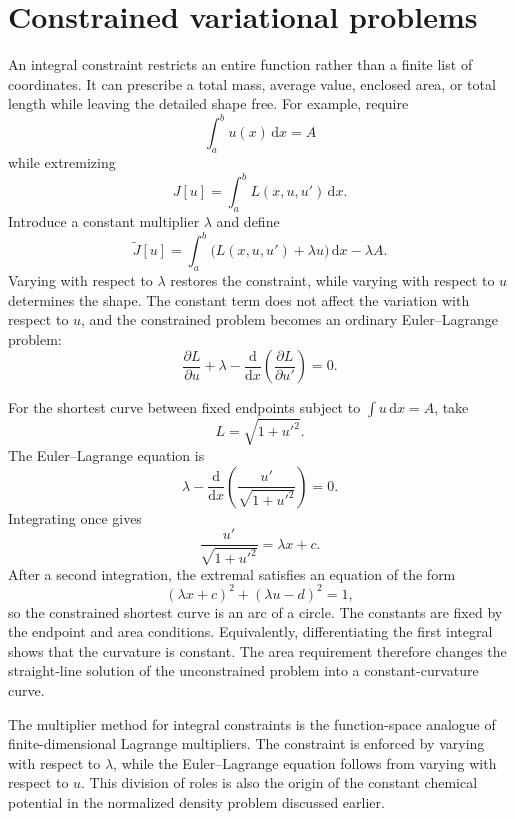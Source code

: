 \section{Constrained variational problems}

An integral constraint restricts an entire function rather than a finite list of coordinates. It can prescribe a total mass, average value, enclosed area, or total length while leaving the detailed shape free. For example, require
\begin{equation}
\int_a^b u(x)\,\mathrm{d}x=A
\end{equation}
while extremizing
\begin{equation}
J[u]=\int_a^b L(x,u,u')\,\mathrm{d}x.
\end{equation}
Introduce a constant multiplier $\lambda$ and define
\begin{equation}
\widetilde J[u]=\int_a^b\bigl(L(x,u,u')+\lambda u\bigr)\,\mathrm{d}x-\lambda A.
\end{equation}
Varying with respect to $\lambda$ restores the constraint, while varying with respect to $u$ determines the shape. The constant term does not affect the variation with respect to $u$, and the constrained problem becomes an ordinary Euler--Lagrange problem:
\begin{equation}
\frac{\partial L}{\partial u}+\lambda
-\frac{\mathrm{d}}{\mathrm{d}x}\left(\frac{\partial L}{\partial u'}\right)=0.
\end{equation}

\begin{example}
For the shortest curve between fixed endpoints subject to $\int u\,\mathrm{d}x=A$, take
\begin{equation}
L=\sqrt{1+u'^2}.
\end{equation}
The Euler--Lagrange equation is
\begin{equation}
\lambda-\frac{\mathrm{d}}{\mathrm{d}x}
\left(\frac{u'}{\sqrt{1+u'^2}}\right)=0.
\end{equation}
Integrating once gives
\begin{equation}
\frac{u'}{\sqrt{1+u'^2}}=\lambda x+c.
\end{equation}
After a second integration, the extremal satisfies an equation of the form
\begin{equation}
(\lambda x+c)^2+(\lambda u-d)^2=1,
\end{equation}
so the constrained shortest curve is an arc of a circle. The constants are fixed by the endpoint and area conditions. Equivalently, differentiating the first integral shows that the curvature is constant. The area requirement therefore changes the straight-line solution of the unconstrained problem into a constant-curvature curve.
\end{example}

The multiplier method for integral constraints is the function-space analogue of finite-dimensional Lagrange multipliers. The constraint is enforced by varying with respect to $\lambda$, while the Euler--Lagrange equation follows from varying with respect to $u$. This division of roles is also the origin of the constant chemical potential in the normalized density problem discussed earlier.